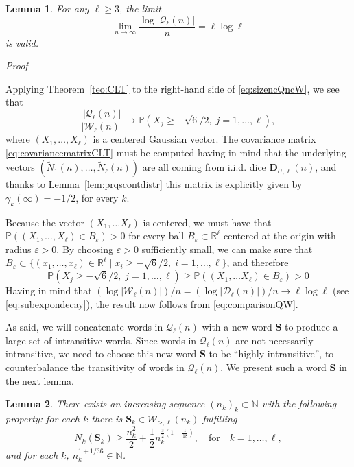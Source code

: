 \documentclass[reqno,a4paper,11pt]{amsart}
\makeatletter
\newcommand{\btt}{\triangleright}
\newtheorem{lemma}{Lemma}
\theoremstyle{remark}
\newcommand{\mc}[1]{{\mathcal #1}}
\newcommand{\mb}[1]{{\mathbf #1}}
\newcommand{\bb}[1]{{\mathbb #1}}
\newcommand{\wt}[1]{{\widetilde{#1}}}
\numberwithin{equation}{section}
\renewenvironment{proof}[1][Proof]{\par
\pushQED{\qed}%
\normalfont \topsep6\p@\@plus6\p@\relax
\trivlist
\item\relax
{\itshape
#1\@addpunct{.}}\hspace\labelsep\ignorespaces
}{%
\popQED\endtrivlist\@endpefalse
}
\makeatother
\begin{document}
\begin{lemma}
For any $\ell\geq 3$, the limit 
    $$
    \lim_{n\to\infty} \frac{\log|\mc Q_{\ell}(n)|}{n} = \ell\log\ell
    $$
%
is valid.
\end{lemma}
\begin{proof}
Applying Theorem~\ref{teo:CLT} to the right-hand side of \eqref{eq:sizencQncW}, we see that
%
\begin{equation}\label{eq:comparisonQW}
\frac{|\mc Q_\ell(n)|}{|\mc W_\ell(n)|}\to \bb P \left( X_j\geq -\sqrt{6}/2,\; j=1,\hdots, \ell \right),
\end{equation}
%
where $(X_1,\hdots, X_\ell)$ is a centered Gaussian vector. The covariance matrix \eqref{eq:covariancematrixCLT} must be computed having in mind that the underlying vectors $(\wt N_1(n),\hdots, \wt N_\ell(n))$ are all coming from i.i.d. dice $\mb D_{U,\ell}(n)$, and thanks to Lemma~\ref{lem:prqscontdistr} this matrix is explicitly given by $\gamma_k(\infty)=-1/2$, for every $k$.

Because the vector $(X_1,\hdots X_\ell)$ is centered, we must have that $\bb P((X_1,\hdots, X_\ell)\in  B_\varepsilon )>0$ for every ball $B_\varepsilon\subset \bb R^\ell$ centered at the origin with radius $\varepsilon>0$. By choosing $\varepsilon>0$ sufficiently small, we can make sure that $B_\varepsilon\subset \{(x_1,\hdots, x_\ell)\in \bb R^\ell \mid x_i\geq -\sqrt{6}/2, \; i=1,\hdots, \ell\}$, and therefore
%
$$
\bb P \left( X_j\geq -\sqrt{6}/2,\; j=1,\hdots, \ell \right)\geq \bb P ((X_1,\hdots X_\ell)\in B_\varepsilon)>0
$$
%
Having in mind that $(\log|\mc W_{\ell}(n)|)/n=(\log|\mc D_{\ell}(n)|)/n \to \ell \log \ell$ (see \eqref{eq:subexpondecay}), the result now follows from \eqref{eq:comparisonQW}.
\end{proof}

As said, we will concatenate words in $\mc Q_\ell(n)$ with a new word $\mb S$ to produce a large set of intransitive words. Since words in $\mc Q_\ell(n)$ are not necessarily intransitive, we need to choose this new word $\mb S$ to be ``highly intransitive'', to counterbalance the transitivity of words in $\mc Q_\ell(n)$. We present such a word $\mb S$ in the next lemma.
    \begin{lemma}\label{lem:specialseqwords}
        There exists an increasing sequence $(n_k)_k\subset\mathbb N$ with the following property: for each $k$ there is $\mb S_k\in \mc W_{\btt, \ell}(n_k)$  fulfilling
        \[
            N_{k}(\mb S_k) \ge \frac{n_k^2}{2}+\frac{1}{2}n_k^{\frac{3}{2}(1+\frac{1}{18})}, \quad \text{for} \quad k=1, \hdots, \ell,
        \]
        and for each $k$, $n_k^{1+{1}/{36}}\in\mathbb{N}$.
    \end{lemma}
    
\end{document}
